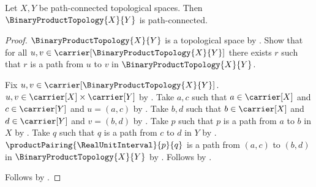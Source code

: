 \begin{theorem}\label{binary_product_of_path_connected_spaces}
    Let $X,Y$ be path-connected topological spaces.
    Then $\BinaryProductTopology{X}{Y}$ is path-connected.
\end{theorem}
\begin{proof}
    $\BinaryProductTopology{X}{Y}$ is a topological space by
        .
    Show that for all $u,v\in\carrier[\BinaryProductTopology{X}{Y}]$ there exists $r$
        such that $r$ is a path from $u$ to $v$ in $\BinaryProductTopology{X}{Y}$.
    \begin{subproof}
        Fix $u,v\in\carrier[\BinaryProductTopology{X}{Y}]$.
        $u,v\in\carrier[X]\times\carrier[Y]$ by .
        Take $a,c$ such that $a\in\carrier[X]$ and $c\in\carrier[Y]$ and $u=(a,c)$ by
            .
        Take $b,d$ such that $b\in\carrier[X]$ and $d\in\carrier[Y]$ and $v=(b,d)$ by
            .
        Take $p$ such that $p$ is a path from $a$ to $b$ in $X$ by .
        Take $q$ such that $q$ is a path from $c$ to $d$ in $Y$ by .
        $\productPairing{\RealUnitInterval}{p}{q}$ is a path from $(a,c)$ to $(b,d)$ in
            $\BinaryProductTopology{X}{Y}$ by .
        Follows by .
    \end{subproof}
    Follows by .
\end{proof}
